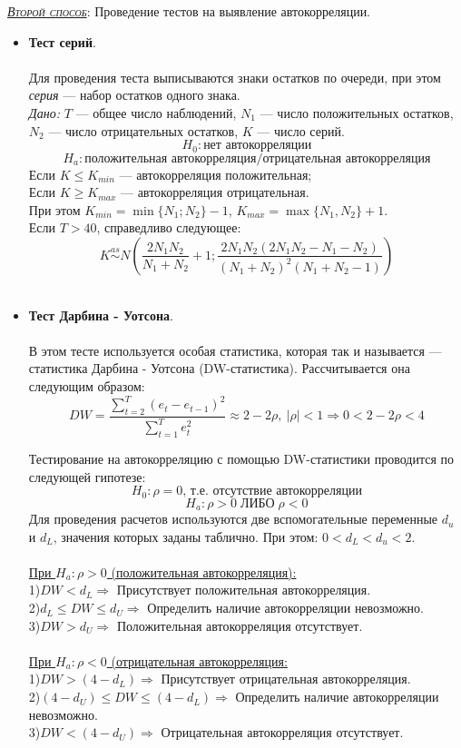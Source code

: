 \documentclass[a0,final]{a0poster}
\begin{document}
\begin{multicols}{4}
\underline{\textsc{\textit{Второй способ}}}: Проведение тестов на выявление автокорреляции. \\
\begin{itemize}
\item \textbf{Тест серий}. \\
\\
Для проведения теста выписываются знаки остатков по очереди, при этом \textit{серия} — набор остатков одного знака. \\
\textit{Дано:} $T$ — общее число наблюдений, $N_1$ — число положительных остатков, $N_2$ — число отрицательных остатков, $K$ — число серий.
\[H_0: \text{нет автокорреляции}\]
\[H_a: \text{положительная автокорреляция/отрицательная автокорреляция}\]
Если $K \le K_{min}$ — автокорреляция положительная; \\
Если $K \ge K_{max}$ — автокорреляция отрицательная. \\
При этом $K_{min} = \min\{N_1;N_2\}-1$, $K_{max} = \max\{N_1,N_2\}+1$.\\
Если $T>40$, справедливо следующее:
\[K\overset{as}{{\sim}}N(\frac{2N_1N_2}{N_1+N_2}+1;\frac{2N_1N_2(2N_1N_2-N_1-N_2)}{(N_1+N_2)^2(N_1+N_2-1)})\]
\\
\item \textbf{Тест Дарбина - Уотсона}. \\
\\
В этом тесте используется особая статистика, которая так и называется — статистика Дарбина - Уотсона (DW-статистика). Рассчитывается она следующим образом:
\[DW=\frac{\sum\limits_{t=2}^T(e_t-e_{t-1})^2}{\sum\limits_{t=1}^T e_t^2}\approx2-2\rho,\:|\rho|<1\Rightarrow0< 2-2\rho<4\]

Тестирование на автокорреляцию с помощью DW-статистики проводится по следующей гипотезе:
\[H_0: \rho=0 \text{, т.е. отсутствие автокорреляции}\]
\[H_a: \rho>0 \; \text{ЛИБО}\;\rho<0\]
Для проведения расчетов используются две вспомогательные переменные $d_u$ и $d_L$, значения которых заданы таблично. При этом: $0<d_L<d_u<2$. \\
\\
\underline{При $H_a: \rho>0$ (положительная автокорреляция):} \\
1)$DW<d_L\Rightarrow$ Присутствует положительная автокорреляция. \\
2)$d_L \le DW \le d_U \Rightarrow$ Определить наличие автокорреляции невозможно. \\
3)$DW>d_U  \Rightarrow$ Положительная автокорреляция отсутствует. \\
\\
\underline{При $H_a: \rho<0$ (отрицательная автокорреляция:} \\
1)$DW>(4-d_L)\Rightarrow$ Присутствует отрицательная автокорреляция. \\
2)$(4-d_U)\leq DW\leq (4-d_L)\Rightarrow$ Определить наличие автокорреляции невозможно.\\
3)$DW<(4-d_U)\Rightarrow$ Отрицательная автокорреляция отсутствует. \\


\end{itemize}
\end{multicols}
\end{document}
